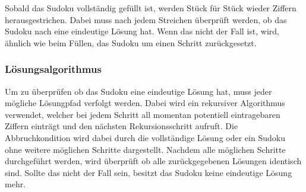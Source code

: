 Sobald das Sudoku vollständig gefüllt ist, werden Stück für Stück wieder Ziffern herausgestrichen.
Dabei muss nach jedem Streichen überprüft werden, ob das Sudoku nach eine eindeutige Lösung hat.
Wenn das nicht der Fall ist, wird, ähnlich wie beim Füllen, das Sudoku um einen Schritt zurückgesetzt. 

\subsubsection{Lösungsalgorithmus}

Um zu überprüfen ob das Sudoku eine eindeutige Lösung hat, muss jeder mögliche Lösungpfad verfolgt werden.
Dabei wird ein rekursiver Algorithmus verwendet, welcher bei jedem Schritt all momentan potentiell eintragebaren Ziffern einträgt
und den nächsten Rekursionsschritt aufruft. 
Die Abbruchkondition wird dabei durch die vollständige Lösung oder ein Sudoku ohne weitere möglichen Schritte dargestellt.
Nachdem alle möglichen Schritte durchgeführt werden, wird überprüft ob alle zurückgegebenen Lösungen identisch sind.
Sollte das nicht der Fall sein, besitzt das Sudoku keine eindeutige Lösung mehr.